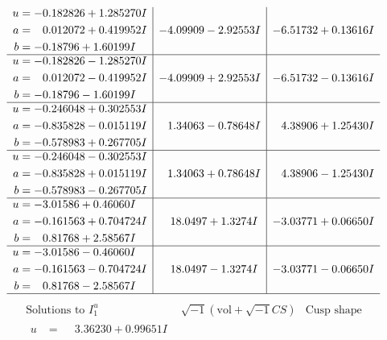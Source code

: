 \documentclass[1p]{elsarticle_modified}
\theoremstyle{definition}
\newcommand{\I}{\sqrt{-1}}
\begin{document}
$$\begin{array}{c|c|c}
\begin{aligned}
u &= -0.182826 + 1.285270 I \\
a &= \phantom{-}0.012072 + 0.419952 I \\
b &= -0.18796 + 1.60199 I\end{aligned}
 & -4.09909 - 2.92553 I & -6.51732 + 0.13616 I \\ \hline\begin{aligned}
u &= -0.182826 - 1.285270 I \\
a &= \phantom{-}0.012072 - 0.419952 I \\
b &= -0.18796 - 1.60199 I\end{aligned}
 & -4.09909 + 2.92553 I & -6.51732 - 0.13616 I \\ \hline\begin{aligned}
u &= -0.246048 + 0.302553 I \\
a &= -0.835828 - 0.015119 I \\
b &= -0.578983 + 0.267705 I\end{aligned}
 & \phantom{-}1.34063 - 0.78648 I & \phantom{-}4.38906 + 1.25430 I \\ \hline\begin{aligned}
u &= -0.246048 - 0.302553 I \\
a &= -0.835828 + 0.015119 I \\
b &= -0.578983 - 0.267705 I\end{aligned}
 & \phantom{-}1.34063 + 0.78648 I & \phantom{-}4.38906 - 1.25430 I \\ \hline\begin{aligned}
u &= -3.01586 + 0.46060 I \\
a &= -0.161563 + 0.704724 I \\
b &= \phantom{-}0.81768 + 2.58567 I\end{aligned}
 & \phantom{-}18.0497 + 1.3274 I & -3.03771 + 0.06650 I \\ \hline\begin{aligned}
u &= -3.01586 - 0.46060 I \\
a &= -0.161563 - 0.704724 I \\
b &= \phantom{-}0.81768 - 2.58567 I\end{aligned}
 & \phantom{-}18.0497 - 1.3274 I & -3.03771 - 0.06650 I\\
 \hline 
 \end{array}$$\newpage$$\begin{array}{c|c|c}  
\text{Solutions to }I^u_{1}& \I (\text{vol} + \sqrt{-1}CS) & \text{Cusp shape}\\
 \hline 
\begin{aligned}
u &= \phantom{-}3.36230 + 0.99651 I \\

\end{aligned}
\end{array}$$
\end{document}
